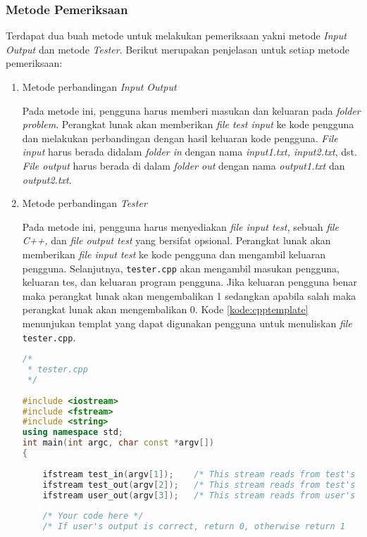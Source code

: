 \subsubsection{Metode Pemeriksaan}
Terdapat dua buah metode untuk melakukan pemeriksaan yakni metode \textit{Input Output} dan metode \textit{Tester}. Berikut merupakan penjelasan untuk setiap metode pemeriksaan:

\begin{enumerate}
\item Metode perbandingan \textit{Input Output}

Pada metode ini, pengguna harus memberi masukan dan keluaran pada \textit{folder problem}. Perangkat lunak akan memberikan \textit{file test input} ke kode pengguna dan melakukan perbandingan dengan hasil keluaran kode pengguna. \textit{File input} harus berada didalam \textit{folder in} dengan nama \textit{input1.txt, input2.txt}, dst. \textit{File output} harus berada di dalam \textit{folder out} dengan nama \textit{output1.txt} dan \textit{output2.txt}.

\item Metode perbandingan \textit{Tester}

Pada metode ini, pengguna harus menyediakan \textit{file input test,} sebuah \textit{file C++,} dan \textit{file output test} yang bersifat opsional. Perangkat lunak akan memberikan \textit{file input test} ke kode pengguna dan mengambil keluaran pengguna. Selanjutnya, \verb|tester.cpp| akan mengambil masukan pengguna, keluaran tes, dan keluaran program pengguna. Jika keluaran pengguna benar maka perangkat lunak akan mengembalikan 1 sedangkan apabila salah maka perangkat lunak akan mengembalikan 0. Kode \ref{kode:cpptemplate} menunjukan templat yang dapat digunakan pengguna untuk menuliskan \textit{file} \texttt{tester.cpp}.

\begin{lstlisting}[language=C++,caption=Templat kode \texttt{tester.cpp}, label=kode:cpptemplate]
/*
 * tester.cpp
 */
 
#include <iostream>
#include <fstream>
#include <string>
using namespace std;
int main(int argc, char const *argv[])
{
 
	ifstream test_in(argv[1]);    /* This stream reads from test's input file   */
	ifstream test_out(argv[2]);   /* This stream reads from test's output file  */
	ifstream user_out(argv[3]);   /* This stream reads from user's output file  */
 
	/* Your code here */
	/* If user's output is correct, return 0, otherwise return 1       */
 

\end{lstlisting}
\end{enumerate}

